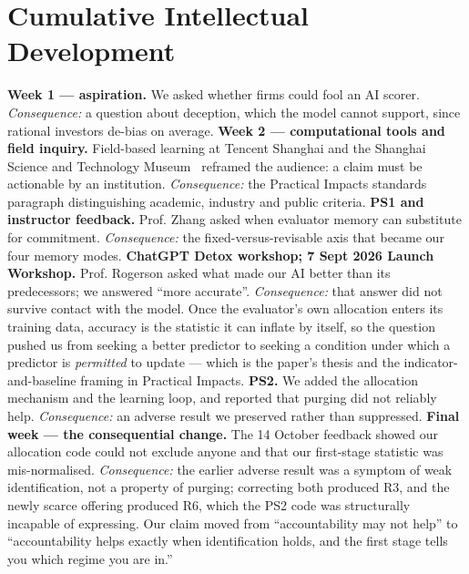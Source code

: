 \section{Cumulative Intellectual Development}
\textbf{Week 1 --- aspiration.} We asked whether firms could fool an AI scorer. \emph{Consequence:} a question about deception, which the model cannot support, since rational investors de-bias on average.
\textbf{Week 2 --- computational tools and field inquiry.} Field-based learning at Tencent Shanghai and the Shanghai Science and Technology Museum~\cite{dku_cscc_2026} reframed the audience: a claim must be actionable by an institution. \emph{Consequence:} the Practical Impacts standards paragraph distinguishing academic, industry and public criteria.
\textbf{PS1 and instructor feedback.} Prof. Zhang asked when evaluator memory can substitute for commitment. \emph{Consequence:} the fixed-versus-revisable axis that became our four memory modes.
\textbf{ChatGPT Detox workshop; 7 Sept 2026 Launch Workshop.} Prof. Rogerson asked what made our AI better than its predecessors; we answered ``more accurate''. \emph{Consequence:} that answer did not survive contact with the model. Once the evaluator's own allocation enters its training data, accuracy is the statistic it can inflate by itself, so the question pushed us from seeking a better predictor to seeking a condition under which a predictor is \emph{permitted} to update --- which is the paper's thesis and the indicator-and-baseline framing in Practical Impacts.
\textbf{PS2.} We added the allocation mechanism and the learning loop, and reported that purging did not reliably help. \emph{Consequence:} an adverse result we preserved rather than suppressed.
\textbf{Final week --- the consequential change.} The 14 October feedback showed our allocation code could not exclude anyone and that our first-stage statistic was mis-normalised. \emph{Consequence:} the earlier adverse result was a symptom of weak identification, not a property of purging; correcting both produced R3, and the newly scarce offering produced R6, which the PS2 code was structurally incapable of expressing. Our claim moved from ``accountability may not help'' to ``accountability helps exactly when identification holds, and the first stage tells you which regime you are in.''

